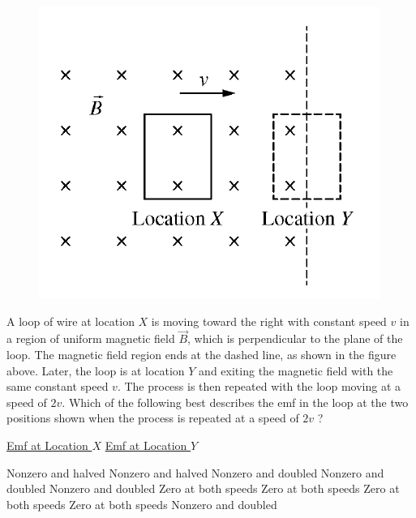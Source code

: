 \begin{figure}[H]
\centering
\includegraphics[scale=0.7]{images/22.png}
\end{figure}

\begin{questions}\setcounter{question}{21}\question
A loop of wire at location $X$ is moving toward the right with constant speed $v$ in a region of uniform magnetic field $\vec{B}$, which is perpendicular to the plane of the loop. The magnetic field region ends at the dashed line, as shown in the figure above. Later, the loop is at location $Y$ and exiting the magnetic field with the same constant speed $v$. The process is then repeated with the loop moving at a speed of $2 v$. Which of the following best describes the emf in the loop at the two positions shown when the process is repeated at a speed of $2 v$ ?

\tabto{0.75cm}\underline{Emf at Location $X$}
\tabto{5.00cm}\underline{Emf at Location $Y$}

\begin{choices}
\choice Nonzero and halved  \tabto{4.25cm} Nonzero and halved
\choice Nonzero and doubled \tabto{4.25cm} Nonzero and doubled
\choice Nonzero and doubled \tabto{4.25cm} Zero at both speeds
\choice Zero at both speeds \tabto{4.25cm} Zero at both speeds
\choice Zero at both speeds \tabto{4.25cm} Nonzero and doubled
\end{choices}\end{questions}
